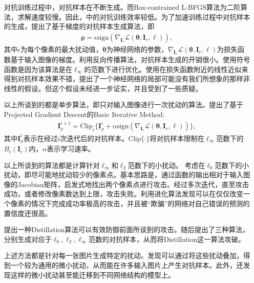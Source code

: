 对抗训练过程中，对抗样本在不断生成。而Box-contrained L-BFGS算法为二阶算法，求解速度较慢。因此，\cite{szegedy2014intriguing}中的对抗训练效率较低。为了加速训练过程中对抗样本的生成，\citet{goodfellow2015explaining}提出了基于梯度的对抗样本生成算法，即
\begin{align}
\bm{\rho} = \epsilon \text{sign} (\nabla_{\bm{I}_c} \mathcal{L} (\bm{\theta}, \bm{I}_c, \ell)),
\end{align}
其中$\epsilon$为每个像素的最大扰动值，$\bm{\theta}$为神经网络的参数，$\nabla_{\bm{I}_c} \mathcal{L} (\bm{\theta}, \bm{I}_c, \ell)$为损失函数基于输入图像的梯度。利用反向传播算法，对抗样本生成的开销很小。使用符号函数是因为该算法是在$\ell_\infty$的范数下进行优化。\citet{goodfellow2015explaining}使用在损失函数附近的线性近似来得到对抗样本效果不错，提出了一个神经网络的局部可能没有我们所想象的那样非线性的假设。但这个假设未经进一步证实，并且受到了一些质疑\cite{tanay2016boundary}。

以上所谈到的都是单步算法，即只对输入图像进行一次扰动的算法。\citet{kurakin2016adversarial}提出了基于Projected Gradient Descent的Basic Iterative Method:
\begin{align}
\bm{I}_\rho^{i+1} = \text{Clip}_\epsilon \{\bm{I}_\rho^i + \alpha \text{sign} (\nabla_{\bm{I}_c} \mathcal{L} (\bm{\theta}, \bm{I}_c, \ell))\},
\end{align}
其中$\bm{I}_\rho^i$表示在经过$i$次迭代后的对抗样本。$\text{Clip}\{\cdot\}$将对抗样本限制在$\ell_\infty$范数下的$B_\epsilon(\bm{I}_c)$内，$\alpha$表示学习速率。

以上所谈到的算法都是计算针对$\ell_\infty$和$\ell_2$范数下的小扰动。
\citet{papernot2016limitations}考虑在$\ell_0$范数下的小扰动，即尽可能地扰动较少的像素点。\citet{papernot2016limitations}基本思路是，通过函数的输出相对于输入图像的Jacobian矩阵，启发式地找出两个像素点进行攻击。经过多次迭代，直至攻击成功，或者修改像素数达到上限，攻击失败。\citet{su2017pixel}利用进化算法发现可以在仅仅改变一个像素的情况下完成成功率极高的攻击，并且被“欺骗”的网络对自己错误的预测的置信度还很高。

\cite{papernot2016distillation}提出一种Distillation算法可以有效防御前面所谈到的\cite{szegedy2014intriguing}\cite{goodfellow2015explaining}\cite{papernot2016limitations}攻击。随后\citep{carlini2017towards}提出了三种算法，分别生成对应于$\ell_0,\ell_2,\ell_\infty$范数的对抗样本，从而将Distillation这一算法攻破。

上述方法都是针对每一张图片生成特定的扰动。\citet{Moosavi-Dezfooli_2017_CVPR}发现可以通过将这些扰动叠加，得到一个较为通用的微小扰动，从而能在许多输入图片上产生对抗样本。此外，\citet{Moosavi-Dezfooli_2017_CVPR}还发现这样的微小扰动甚至能迁移到不同网络结构的模型上。


